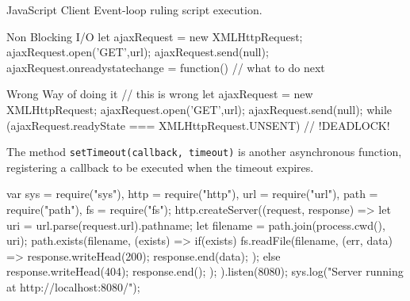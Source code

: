 \begin{example}{JavaScript Client}{}
    Event-loop ruling script execution.
    \begin{codeblock}[js]{Non Blocking I/O}
    let ajaxRequest = new XMLHttpRequest;
    ajaxRequest.open('GET',url);
    ajaxRequest.send(null);
    ajaxRequest.onreadystatechange =
    function() {
        // what to do next
    }
    \end{codeblock}
    \begin{codeblock}[js]{Wrong Way of doing it}
    // this is wrong
    let ajaxRequest = new XMLHttpRequest;
    ajaxRequest.open('GET',url);
    ajaxRequest.send(null);
    while (ajaxRequest.readyState === XMLHttpRequest.UNSENT) {}
    // !DEADLOCK!
    \end{codeblock}
    The method \texttt{setTimeout(callback, timeout)} is another asynchronous function, registering a callback to be executed when the timeout expires.
    \begin{codeblock}[js]{}
    var sys = require("sys"),
    http = require("http"),
    url = require("url"),
    path = require("path"),
    fs = require("fs");
    http.createServer((request, response) => {
        let uri = url.parse(request.url).pathname;
        let filename = path.join(process.cwd(), uri);
        path.exists(filename, (exists) => {
            if(exists) {
                fs.readFile(filename, (err, data) => {
                    response.writeHead(200);
                    response.end(data);
                });
            } else {
                response.writeHead(404);
                response.end();
            }
        });
    }).listen(8080);
    sys.log("Server running at http://localhost:8080/");
    \end{codeblock}
\end{example}
%
